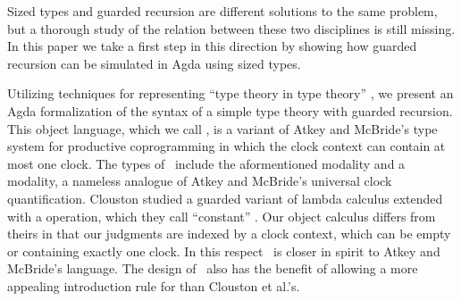 



Sized types and guarded recursion are different solutions to the same
problem, but a thorough study of the relation between these two
disciplines is still missing. In this paper we take a first step in
this direction by showing how guarded recursion can be simulated in
Agda using sized types. 

Utilizing techniques for representing ``type theory in type theory''
\cite{AltenkirchK16,Chapman09}, we present an Agda formalization of
the syntax of a simple type theory with guarded recursion. This object
language, which we call \GTT, is a variant of Atkey and McBride's type
system for productive coprogramming \cite{atkey2013productive} in
which the clock context can contain at most one clock. The types of
\GTT\ include the aformentioned  modality and a  modality,
a nameless analogue of Atkey and McBride's universal clock
quantification. Clouston \etal \cite{CloustonBGB15} studied a
guarded variant of lambda calculus extended with a  operation,
which they call ``constant'' .  Our object calculus differs from
theirs in that our judgments are indexed by a clock context, which can
be empty or containing exactly one clock. In this respect \GTT\ is
closer in spirit to Atkey and McBride's language. The design of \GTT\
also has the benefit of allowing a more appealing introduction rule for
\IC{□} than Clouston et al.'s.


